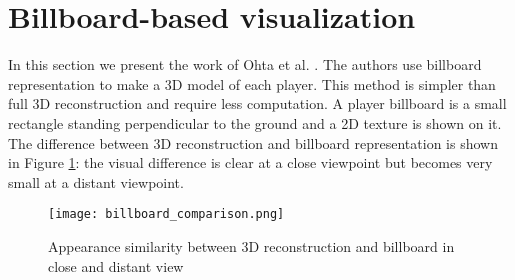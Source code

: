\section{Billboard-based visualization}
In this section we present the work of Ohta et al. \cite{billboard}.
The authors use billboard representation to make a 3D model of each player.
This method is simpler than full 3D reconstruction and require less computation.
A player billboard is a small rectangle standing perpendicular to the ground
and a 2D texture is shown on it.
The difference between 3D reconstruction and billboard representation is shown in Figure \ref{fig:billboard_comparison}:
the visual difference is clear at a close viewpoint but becomes very small at a distant viewpoint.

\begin{figure}[htbp]
\centerline{\texttt{[image: billboard\_comparison.png]}}
\caption{Appearance similarity between 3D reconstruction and billboard in close and distant view \cite{billboard}}
\label{fig:billboard_comparison}
\end{figure}